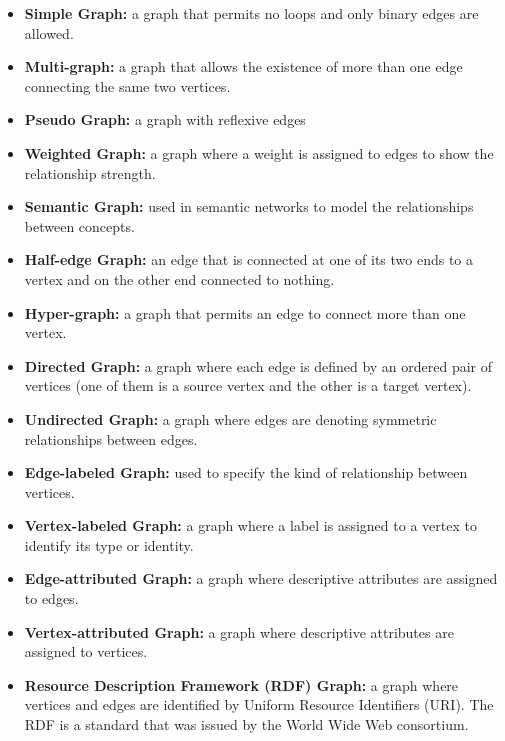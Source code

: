 {\begin{itemize}  
\item \textbf{Simple Graph:} a graph that permits no loops and only binary edges are allowed.

\item \textbf{Multi-graph:} a graph that allows the existence of more than one edge connecting the same two vertices.

\item \textbf{Pseudo Graph:} a graph with reflexive edges

\item \textbf{Weighted Graph:} a graph where a weight is assigned to edges to show the relationship strength.

\item \textbf{Semantic Graph:} used in semantic networks to model the relationships between concepts.

\item \textbf{Half-edge Graph:} an edge that is connected at one of its two ends to a vertex and on the other end connected to nothing.

\item \textbf{Hyper-graph:} a graph that permits an edge to connect more than one vertex.

\item \textbf{Directed Graph:} a graph where each edge is defined by an ordered pair of vertices (one of them is a source vertex and the other is a target vertex).

\item \textbf{Undirected Graph:} a graph where edges are denoting symmetric relationships between edges.

\item \textbf{Edge-labeled Graph:} used to specify the kind of relationship between vertices.

\item \textbf{Vertex-labeled Graph:} a graph where a label is assigned to a vertex to identify its type or identity.

\item \textbf{Edge-attributed Graph:} a graph where descriptive attributes are assigned to edges.

\item \textbf{Vertex-attributed Graph:} a graph where descriptive attributes are assigned to vertices.

\item \textbf{Resource Description Framework (RDF) Graph:} a graph where vertices and edges are identified by Uniform Resource Identifiers (URI). The RDF is a standard that was issued by the World Wide Web consortium.


\end{itemize}}
